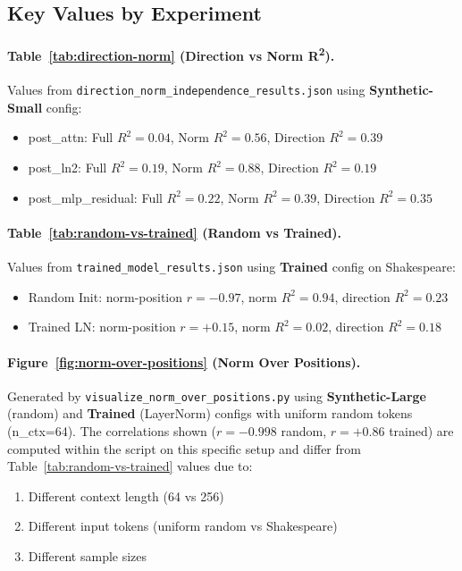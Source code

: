 \documentclass[11pt]{article}
\begin{document}
\subsection{Key Values by Experiment}

\paragraph{Table~\ref{tab:direction-norm} (Direction vs Norm R\textsuperscript{2}).} 
Values from \texttt{direction\_norm\_independence\_results.json} using \textbf{Synthetic-Small} config:
\begin{itemize}
    \item post\_attn: Full $R^2=0.04$, Norm $R^2=0.56$, Direction $R^2=0.39$
    \item post\_ln2: Full $R^2=0.19$, Norm $R^2=0.88$, Direction $R^2=0.19$
    \item post\_mlp\_residual: Full $R^2=0.22$, Norm $R^2=0.39$, Direction $R^2=0.35$
\end{itemize}

\paragraph{Table~\ref{tab:random-vs-trained} (Random vs Trained).}
Values from \texttt{trained\_model\_results.json} using \textbf{Trained} config on Shakespeare:
\begin{itemize}
    \item Random Init: norm-position $r=-0.97$, norm $R^2=0.94$, direction $R^2=0.23$
    \item Trained LN: norm-position $r=+0.15$, norm $R^2=0.02$, direction $R^2=0.18$
\end{itemize}

\paragraph{Figure~\ref{fig:norm-over-positions} (Norm Over Positions).}
Generated by \texttt{visualize\_norm\_over\_positions.py} using \textbf{Synthetic-Large} (random) and \textbf{Trained} (LayerNorm) configs with uniform random tokens (n\_ctx=64). The correlations shown ($r=-0.998$ random, $r=+0.86$ trained) are computed within the script on this specific setup and differ from Table~\ref{tab:random-vs-trained} values due to:
\begin{enumerate}
    \item Different context length (64 vs 256)
    \item Different input tokens (uniform random vs Shakespeare)
    \item Different sample sizes
\end{enumerate}
\end{document}
